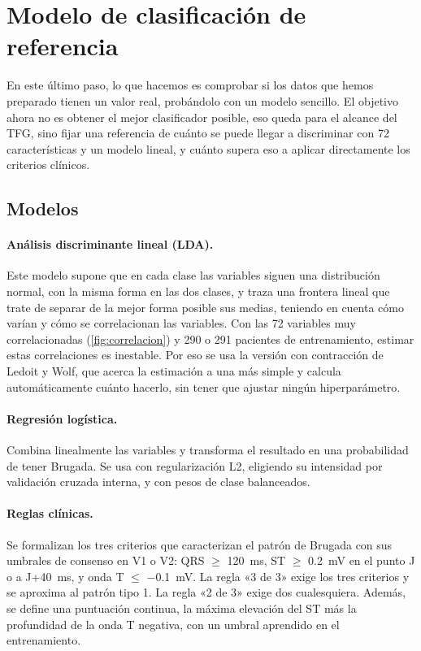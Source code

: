 \clearpage
\section{Modelo de clasificación de referencia}\label{cap:modelo}

En este último paso, lo que hacemos es comprobar si los datos que hemos preparado tienen un valor real, probándolo con un modelo sencillo. El objetivo ahora no es obtener el mejor clasificador posible, eso queda para el alcance del TFG, sino fijar una referencia de cuánto se puede llegar a discriminar con 72 características y un modelo lineal, y cuánto supera eso a aplicar directamente los criterios clínicos.

\subsection{Modelos}

\paragraph{Análisis discriminante lineal (LDA).} Este modelo supone que en cada clase las variables siguen una distribución normal, con la misma forma en las dos clases, y traza una frontera lineal que trate de separar de la mejor forma posible sus medias, teniendo en cuenta cómo varían y cómo se correlacionan las variables. Con las 72 variables muy correlacionadas (\cref{fig:correlacion}) y 290 o 291 pacientes de entrenamiento, estimar estas correlaciones es inestable. Por eso se usa la versión con contracción de Ledoit y Wolf, que acerca la estimación a una más simple y calcula automáticamente cuánto hacerlo, sin tener que ajustar ningún hiperparámetro.

\paragraph{Regresión logística.} Combina linealmente las variables y transforma el resultado en una probabilidad de tener Brugada. Se usa con regularización L2, eligiendo su intensidad por validación cruzada interna, y con pesos de clase balanceados.

\paragraph{Reglas clínicas.} Se formalizan los tres criterios que caracterizan el patrón de Brugada con sus umbrales de consenso en V1 o V2: QRS $\geq$ \SI{120}{\milli\second}, ST $\geq$ \SI{0.2}{\milli\volt} en el punto J o a J+\SI{40}{\milli\second}, y onda T $\leq$ \SI{-0.1}{\milli\volt}. La regla «3 de 3» exige los tres criterios y se aproxima al patrón tipo 1. La regla «2 de 3» exige dos cualesquiera. Además, se define una puntuación continua, la máxima elevación del ST más la profundidad de la onda T negativa, con un umbral aprendido en el entrenamiento.

